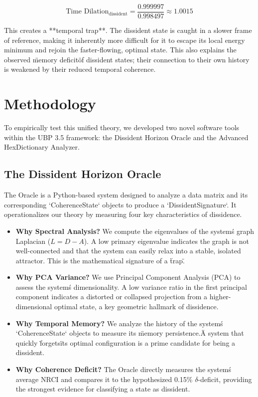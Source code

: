 \documentclass[12pt, a4paper]{article}
\begin{document}
\begin{equation}
    \text{Time Dilation}_{\text{dissident}} = \frac{0.999997}{0.998497} \approx 1.0015
\end{equation}

This creates a **temporal trap**. The dissident state is caught in a slower frame of reference, making it inherently more difficult for it to escape its local energy minimum and rejoin the faster-flowing, optimal state. This also explains the observed \"memory deficit\" of dissident states; their connection to their own history is weakened by their reduced temporal coherence.

\section{Methodology}
To empirically test this unified theory, we developed two novel software tools within the UBP 3.5 framework: the Dissident Horizon Oracle and the Advanced HexDictionary Analyzer.

\subsection{The Dissident Horizon Oracle}
The Oracle is a Python-based system designed to analyze a data matrix and its corresponding `CoherenceState` objects to produce a `DissidentSignature`. It operationalizes our theory by measuring four key characteristics of dissidence.

\begin{itemize}
    \item \textbf{Why Spectral Analysis?} We compute the eigenvalues of the system\'s graph Laplacian ($L = D - A$). A low primary eigenvalue indicates the graph is not well-connected and that the system can easily relax into a stable, isolated attractor. This is the mathematical signature of a \"trap.\"
    \item \textbf{Why PCA Variance?} We use Principal Component Analysis (PCA) to assess the system\'s dimensionality. A low variance ratio in the first principal component indicates a distorted or collapsed projection from a higher-dimensional optimal state, a key geometric hallmark of dissidence.
    \item \textbf{Why Temporal Memory?} We analyze the history of the system\'s `CoherenceState` objects to measure its \"memory persistence.\" A system that quickly \"forgets\" its optimal configuration is a prime candidate for being a dissident.
    \item \textbf{Why Coherence Deficit?} The Oracle directly measures the system\'s average NRCI and compares it to the hypothesized 0.15\% $\delta$-deficit, providing the strongest evidence for classifying a state as dissident.
\end{itemize}
\end{document}
